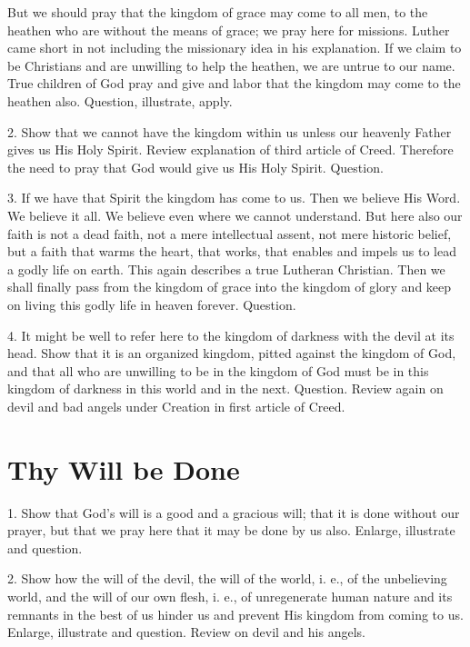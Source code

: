 But we should pray that the kingdom of grace may come to all men, to the heathen who are without the means of grace; we pray here for missions. Luther came short in not including the missionary idea in his explanation. If we claim to be Christians and are unwilling to help the heathen, we are untrue to our name. True children of God pray and give and labor that the kingdom may come to the heathen also. Question, illustrate, apply.

 2. Show that we cannot have the kingdom within us unless our heavenly Father gives us His Holy Spirit. Review explanation of third article of Creed. Therefore the need to pray that God would give us His Holy Spirit. Question.

3. If we have that Spirit the kingdom has come to us. Then we believe His Word. We believe it all. We believe even where we cannot understand.
But here also our faith is not a dead faith, not a mere intellectual assent, not mere historic belief, but a faith that warms the heart, that works, that enables and impels us to lead a godly life on earth. This again describes a true Lutheran Christian. Then we shall finally pass from the kingdom of grace into the kingdom of glory and keep on living this godly life in heaven forever. Question.

 4. It might be well to refer here to the kingdom of darkness with the devil at its head. Show that it is an organized kingdom, pitted against the kingdom of God, and that all who are unwilling to be in the kingdom of God must be in this kingdom of darkness in this world and in the next. Question. Review again on devil and bad angels under Creation in first article of Creed.

\section{Thy Will be Done}

 1. Show that God’s will is a good and a gracious will; that it is done without our prayer, but that we pray here that it may be done by us also. Enlarge, illustrate and question.

2. Show how the will of the devil, the will of the world, i. e., of the unbelieving world, and the will of our own flesh, i. e., of unregenerate human nature and its remnants in the best of us hinder us and prevent His kingdom from coming to us. Enlarge, illustrate
and question. Review on devil and his angels.

